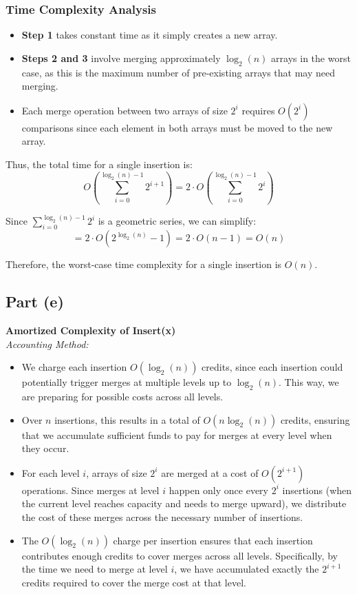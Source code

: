 \documentclass{article}
\begin{document}
\subsubsection*{Time Complexity Analysis}
\begin{itemize}
    \item \textbf{Step 1} takes constant time as it simply creates a new array.
    \item \textbf{Steps 2 and 3} involve merging approximately \( \log_2(n) \) arrays in the worst case, as this is the maximum number of pre-existing arrays that may need merging.
    \item Each merge operation between two arrays of size \( 2^i \) requires \( O(2^i) \) comparisons since each element in both arrays must be moved to the new array.
\end{itemize}

Thus, the total time for a single insertion is:
\[
O\left( \sum_{i=0}^{\log_2(n)-1} 2^{i+1} \right) = 2 \cdot O\left( \sum_{i=0}^{\log_2(n)-1} 2^i \right)
\]

Since \( \sum_{i=0}^{\log_2(n)-1} 2^i \) is a geometric series, we can simplify:
\[
= 2 \cdot O\left( 2^{\log_2(n)} - 1 \right) = 2 \cdot O(n - 1) = O(n)
\]

Therefore, the worst-case time complexity for a single insertion is \( O(n) \).



\subsection*{Part (e)}
\textbf{Amortized Complexity of Insert(x)} \\
\textit{Accounting Method:}
\begin{itemize}
    \item We charge each insertion \( O(\log_2(n)) \) credits, since each insertion could potentially trigger merges at multiple levels up to \( \log_2(n) \). This way, we are preparing for possible costs across all levels.
    \item Over \( n \) insertions, this results in a total of \( O(n \log_2(n)) \) credits, ensuring that we accumulate sufficient funds to pay for merges at every level when they occur.
    \item For each level \( i \), arrays of size \( 2^i \) are merged at a cost of \( O(2^{i+1}) \) operations. Since merges at level \( i \) happen only once every \( 2^i \) insertions (when the current level reaches capacity and needs to merge upward), we distribute the cost of these merges across the necessary number of insertions.
    \item The \( O(\log_2(n)) \) charge per insertion ensures that each insertion contributes enough credits to cover merges across all levels. Specifically, by the time we need to merge at level \( i \), we have accumulated exactly the \( 2^{i+1} \) credits required to cover the merge cost at that level.
\end{itemize}
\end{document}
